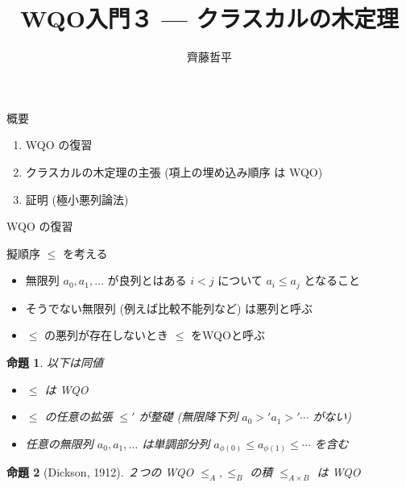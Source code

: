 \documentclass{beamer}
\title{WQO入門３ --- クラスカルの木定理}
\author{齊藤哲平}
\newtheorem{prop}{命題}
\begin{document}
\begin{frame}
  \maketitle
\end{frame}

\begin{frame}{概要}
\begin{enumerate}
\itemsep 2em
\item WQO の復習
\item クラスカルの木定理の主張 (項上の埋め込み順序 は WQO)
\item 証明 (極小悪列論法)
\end{enumerate}
\end{frame}

\begin{frame}{WQO の復習}
\begin{definition}
擬順序 $\leqslant$ を考える
\begin{itemize}
    \item 無限列 $a_0, a_1, \ldots$ が\alert{良列}とはある $i < j$ について $a_i \leqslant a_j$ となること \pause
    \item そうでない無限列 (例えば比較不能列など) は\alert{悪列}と呼ぶ \pause
    \item $\leqslant$ の悪列が存在しないとき $\leqslant$ を\alert{WQO}と呼ぶ
\end{itemize}
\end{definition}
\pause
\begin{prop}
以下は同値
\begin{itemize}
\item $\leqslant$ は WQO
\item $\leqslant$ の任意の拡張 $\leqslant'$ が整礎 (無限降下列 $a_0 >' a_1 >' \cdots$ がない) \pause
\item 任意の無限列 $a_0, a_1, \ldots$ は単調部分列 $a_{\phi(0)} \leqslant a_{\phi(1)} \leqslant \cdots$ を含む
\end{itemize}
\end{prop}
\pause
\begin{prop}[Dickson, 1912]
２つの WQO $\leqslant_A, \leqslant_B$ の積 $\leqslant_{A \times B}$ は WQO
\end{prop}
\end{frame}
\end{document}
